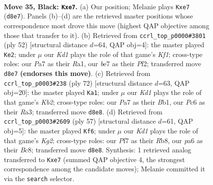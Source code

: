 \documentclass[11pt]{article}
\begin{document}
\clearpage

\begin{figure}[p]\centering
\begin{subfigure}{0.46\textwidth}\centering
\resizebox{\linewidth}{!}{%
\newchessgame
\chessboard[
  setfen={2rk4/p1p1Bp1r/P1p1b1p1/2P4p/1P3P1P/8/8/RN2K2R b Q - 0 35},
  showmover=false,
  pgfstyle=straightmove, color=movearrow, markmove={d8-e7}
]}
\caption{}
\end{subfigure}\hfill
\begin{subfigure}{0.46\textwidth}\centering
\resizebox{\linewidth}{!}{%
\newchessgame
\chessboard[
  setfen={2k4r/3rb3/pB2pp2/P6p/2p5/1pP2P2/1P3P1P/R2R1K2 w - - 0 27},
  showmover=false,
  pgfstyle=straightmove, color=movearrow, markmove={f1-e2}
]}
\caption{}
\end{subfigure}
\\[4pt]
\begin{subfigure}{0.46\textwidth}\centering
\resizebox{\linewidth}{!}{%
\newchessgame
\chessboard[
  setfen={1r1r2k1/5p1p/4p3/3pP1Pp/2bP1P2/R7/PK1R4/1B6 w - - 2 37},
  showmover=false,
  pgfstyle=straightmove, color=movearrow, markmove={b2-a1}
]}
\caption{}
\end{subfigure}\hfill
\begin{subfigure}{0.46\textwidth}\centering
\resizebox{\linewidth}{!}{%
\newchessgame
\chessboard[
  setfen={1rb5/6k1/pp1p3r/3Bpp2/P1P5/3P2PP/6K1/R3R3 b - - 0 29},
  showmover=false,
  pgfstyle=straightmove, color=movearrow, markmove={g7-f6}
]}
\caption{}
\end{subfigure}
\caption{\textbf{Move 35, Black: \texttt{Kxe7}.} (a) Our position; Melanie plays \texttt{Kxe7} (\texttt{d8e7}). Panels (b)--(d) are the retrieved master positions whose correspondence most drove this move (highest QAP objective among those that transfer to it). (b) Retrieved from \texttt{ccrl\_top\_p0000\#3801} (ply 52) [structural distance $d$=64, QAP obj=4]: the master played \texttt{Ke2}; under $\mu$ our \emph{Kd1} plays the role of that game's \emph{Kf1}; cross-type roles: our \emph{P}a7 as their \emph{R}a1, our \emph{b}e7 as their \emph{P}f2; transferred move \texttt{d8e7} \textbf{(endorses this move)}. (c) Retrieved from \texttt{ccrl\_top\_p0003\#238} (ply 72) [structural distance $d$=63, QAP obj=20]: the master played \texttt{Ka1}; under $\mu$ our \emph{Kd1} plays the role of that game's \emph{Kb2}; cross-type roles: our \emph{P}a7 as their \emph{B}b1, our \emph{P}c6 as their \emph{R}a3; transferred move \texttt{d8e8}. (d) Retrieved from \texttt{ccrl\_top\_p0003\#2609} (ply 57) [structural distance $d$=61, QAP obj=5]: the master played \texttt{Kf6}; under $\mu$ our \emph{Kd1} plays the role of that game's \emph{Kg2}; cross-type roles: our \emph{P}f7 as their \emph{R}b8, our \emph{p}a6 as their \emph{B}c8; transferred move \texttt{d8e8}. Synthesis: 1 retrieved analog transferred to \texttt{Kxe7} (summed QAP objective 4, the strongest correspondence among the candidate moves); Melanie committed it via the \texttt{search} selector.}
\label{fig:thought-m69}
\end{figure}
\end{document}
